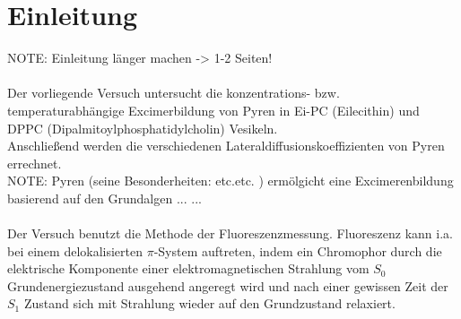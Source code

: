 \pagestyle{headings}
\setcounter{page}{1}

\section{Einleitung}
NOTE: Einleitung länger machen -> 1-2 Seiten! \\\\

Der vorliegende Versuch untersucht die konzentrations- bzw. temperaturabhängige Excimerbildung von Pyren in Ei-PC (Eilecithin) und DPPC (Dipalmitoylphosphatidylcholin) Vesikeln.\\
Anschließend werden die verschiedenen Lateraldiffusionskoeffizienten von Pyren errechnet. \\

NOTE: Pyren (seine Besonderheiten: etc.etc. ) ermölgicht eine Excimerenbildung basierend auf den Grundalgen ... ...
\\\\
Der Versuch benutzt die Methode der Fluoreszenzmessung. Fluoreszenz kann i.a. bei einem delokalisierten $\pi$-System auftreten, indem ein Chromophor durch die elektrische Komponente einer elektromagnetischen Strahlung vom $S_0$ Grundenergiezustand ausgehend angeregt wird und nach einer gewissen Zeit der $S_1$ Zustand sich mit Strahlung wieder auf den Grundzustand relaxiert.
